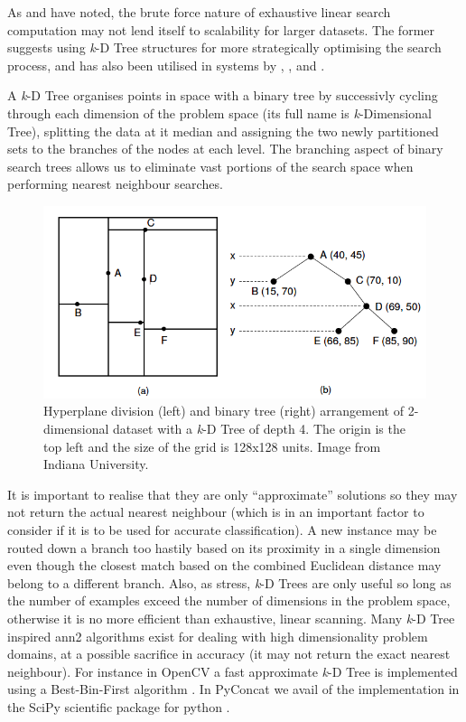 {{{{{{{As \cite{Collins2007} and \cite{Dannenberg2006} have noted, the brute force nature of exhaustive linear search computation may not lend itself to scalability for larger datasets. The former suggests using \textit{k}-D Tree structures for more strategically optimising the search process, and has also been utilised in systems by \cite{Schwarz2009}, \cite{Einbond2010}, \cite{Stoll2013} and \cite{Klugel2014}.

A \textit{k}-D Tree organises points in space with a binary tree by successivly cycling through each dimension of the problem space (its full name is \textit{k}-Dimensional Tree), splitting the data at it median and assigning the two newly partitioned sets to the branches of the nodes at each level. The branching aspect of binary search trees allows us to eliminate vast portions of the search space when performing nearest neighbour searches. 

\begin{figure}
	\begin{center}
		\includegraphics[width=1.0\textwidth]{ch05_pyconcat/figures/kdTree.png}
	\end{center}
	\caption[]{Hyperplane division (left) and binary tree (right) arrangement of 2-dimensional dataset with a \textit{k}-D Tree of depth 4. The origin is the top left and the size of the grid is 128x128 units. Image from Indiana University.}
	\label{fig:markov_unit}
\end{figure}

It is important to realise that they are only ``approximate'' solutions so they may not return the actual nearest neighbour (which is in an important factor to consider if it is to be used for accurate classification). A new instance may be routed down a branch too hastily based on its proximity in a single dimension even though the closest match based on the combined Euclidean distance may  belong to a different branch. Also, as \cite{Russell2002} stress, \textit{k}-D Trees are only useful so long as the number of examples exceed the number of dimensions in the problem space, otherwise it is no more efficient than exhaustive, linear scanning. Many \textit{k}-D Tree inspired \acrfull{ann2} algorithms exist for dealing with high dimensionality problem domains, at a possible sacrifice in accuracy (it may not return the exact nearest neighbour). For instance in OpenCV a fast approximate \textit{k}-D Tree is implemented using a Best-Bin-First algorithm \citep{kaehler2016learning}. In PyConcat we avail of the implementation in the SciPy scientific package for python \citep{Scipy2014}.

}}}}}}}
